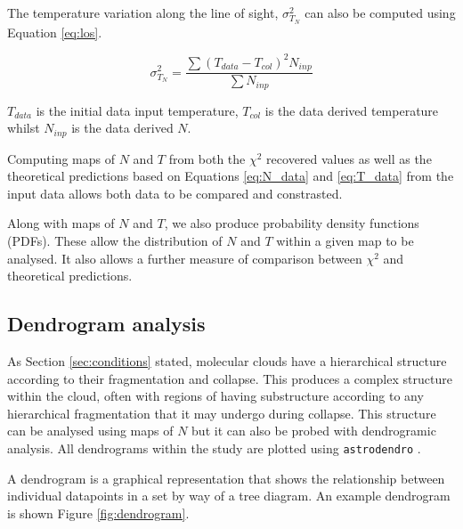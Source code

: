 \documentclass{report}
\begin{document}
The temperature variation along the line of sight, $\sigma_{T_{N}}^{2}$ can also be computed using Equation \ref{eq:los}.

\begin{equation}
  \sigma_{T_{N}}^{2} = \frac{\sum{(T_{data}-T_{col})^{2}}N_{inp}}{\sum{N_{inp}}}
   \label{eq:los}
\end{equation}

$T_{data}$ is the initial data input temperature, $T_{col}$ is the data derived temperature whilst $N_{inp}$ is the data derived $N$.

Computing maps of $N$ and $T$ from both the $\chi^{2}$ recovered values as well as the theoretical predictions based on Equations \ref{eq:N_data} and \ref{eq:T_data} from the input data allows both data to be compared and constrasted.

Along with maps of $N$ and $T$, we also produce probability density functions (PDFs). These allow the distribution of $N$ and $T$ within a given map to be analysed. It also allows a further measure of comparison between $\chi^{2}$ and theoretical predictions.

\subsection{Dendrogram analysis}
As Section \ref{sec:conditions} stated, molecular clouds have a hierarchical structure according to their fragmentation and collapse. This produces a complex structure within the cloud, often with regions of having substructure according to any hierarchical fragmentation that it may undergo during collapse. This structure can be analysed using maps of $N$ but it can also be probed with dendrogramic analysis. All dendrograms within the study are plotted using \texttt{astrodendro} \parencite{astrodendro}.

A dendrogram is a graphical representation that shows the relationship between individual datapoints in a set by way of a tree diagram. An example dendrogram is shown Figure \ref{fig:dendrogram}.
\end{document}
